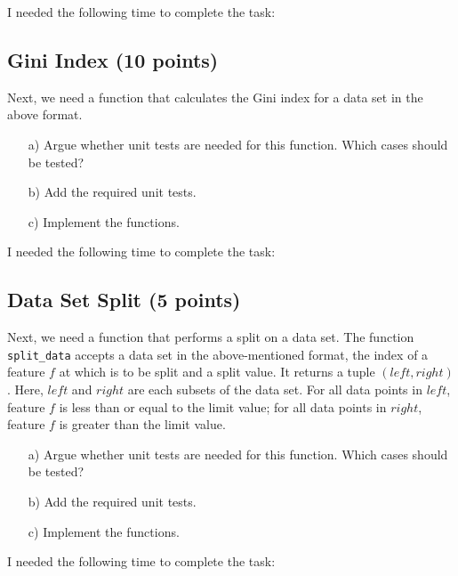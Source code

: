 \documentclass{article}
\begin{document}
I needed the following time to complete the task:

\subsection{Gini Index (10 points)}

Next, we need a function that calculates the Gini index for a data set in the above format. 

\begin{enumerate}

\item[a)] Argue whether unit tests are needed for this function. Which cases should be tested?

\item[b)] Add the required unit tests.

\item[c)] Implement the functions.

\end{enumerate}

I needed the following time to complete the task:

\subsection{Data Set Split (5 points)}

Next, we need a function that performs a split on a data set. The function \texttt{split\_data} accepts a data set in the above-mentioned format, the index of a feature $f$ at which
is to be split and a split value. It returns a tuple $(left, right)$. Here, $left$ and $right$ are each subsets of the data set. For all data points in $left$, feature $f$ is less than or equal to the limit value; for all data points in $right$, feature $f$ is greater than the limit value.

\begin{enumerate}

\item[a)] Argue whether unit tests are needed for this function. Which cases should be tested?

\item[b)] Add the required unit tests.

\item[c)] Implement the functions.

\end{enumerate}

I needed the following time to complete the task:
\end{document}
